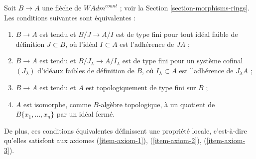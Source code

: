 \begin{lemma}
\label{lemma-quotient-restricted-power-series}
Soit $B \to A$ une flèche de $\textit{WAdm}^{count}$ ; voir la
Section \ref{section-morphisms-rings}.
Les conditions suivantes sont équivalentes :
\begin{enumerate}
\item[(a)] $B \to A$ est tendu et $B/J \to A/I$ est de type fini pour
tout idéal faible de définition $J \subset B$, où l'idéal $I \subset A$ est
l'adhérence de $JA$ ;
\item[(b)] $B \to A$ est tendu et $B/J_\lambda \to A/I_\lambda$
est de type fini pour un système cofinal $(J_\lambda)$
d'idéaux faibles de définition de $B$, où
$I_\lambda \subset A$ est l'adhérence de $J_\lambda A$ ;
\item[(c)] $B \to A$ est tendu et $A$ est topologiquement de type
fini sur $B$ ;
\item[(d)] $A$ est isomorphe, comme $B$-algèbre topologique, à un quotient de
$B\{x_1, \ldots, x_n\}$ par un idéal fermé.
\end{enumerate}
De plus, ces conditions équivalentes définissent une propriété locale,
c'est-à-dire qu'elles satisfont aux
axiomes (\ref{item-axiom-1}), (\ref{item-axiom-2}), (\ref{item-axiom-3}).
\end{lemma}

